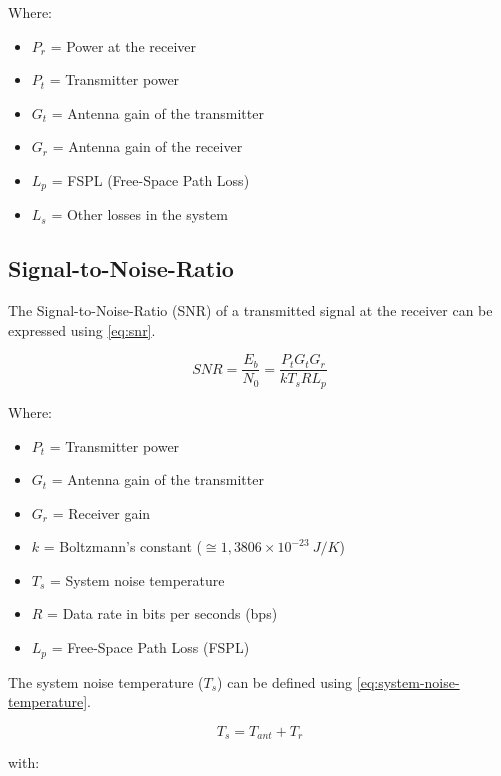 Where:

\begin{itemize}
    \item $P_{r}$ = Power at the receiver
    \item $P_{t}$ = Transmitter power
    \item $G_{t}$ = Antenna gain of the transmitter
    \item $G_{r}$ = Antenna gain of the receiver
    \item $L_{p}$ = FSPL (Free-Space Path Loss)
    \item $L_{s}$ = Other losses in the system
\end{itemize}

\subsection{Signal-to-Noise-Ratio}

The Signal-to-Noise-Ratio (SNR) of a transmitted signal at the receiver can be expressed using \autoref{eq:snr}.

\begin{equation} \label{eq:snr}
    SNR = \frac{E_{b}}{N_{0}} = \frac{P_{t}G_{t}G_{r}}{kT_{s}RL_{p}}
\end{equation}

Where:

\begin{itemize}
    \item $P_{t}$ = Transmitter power
    \item $G_{t}$ = Antenna gain of the transmitter
    \item $G_{r}$ = Receiver gain
    \item $k$ = Boltzmann's constant ($\cong 1,3806 \times 10^{-23}\ J/K$)
    \item $T_{s}$ = System noise temperature
    \item $R$ = Data rate in bits per seconds (bps)
    \item $L_{p}$ = Free-Space Path Loss (FSPL)
\end{itemize}

The system noise temperature ($T_{s}$) can be defined using \autoref{eq:system-noise-temperature}.

\begin{equation} \label{eq:system-noise-temperature}
    T_{s} = T_{ant} + T_{r}
\end{equation}

with:

